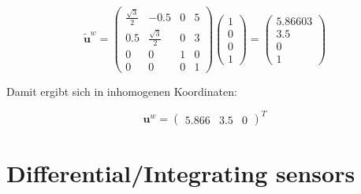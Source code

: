 \documentclass[12pt,a4paper]{report}
\begin{document}
\[
    \tilde{\mathbf{u}}^w = \begin{pmatrix}
        \frac{\sqrt{3}}{2} & -0.5               & 0 & 5 \\
        0.5                & \frac{\sqrt{3}}{2} & 0 & 3 \\
        0                  & 0                  & 1 & 0 \\
        0                  & 0                  & 0 & 1
    \end{pmatrix}
    \begin{pmatrix}
        1 \\ 0 \\ 0 \\ 1
    \end{pmatrix}
    =
    \begin{pmatrix}
        5.86603 \\ 3.5 \\ 0 \\ 1
    \end{pmatrix}
\]

Damit ergibt sich in inhomogenen Koordinaten:

\[\mathbf{u}^w = \begin{pmatrix} 5.866 & 3.5 & 0 \end{pmatrix}^{T}\]

\chapter{Differential/Integrating sensors}

\clearpage
\printbibliography[heading=bibintoc]
\end{document}
